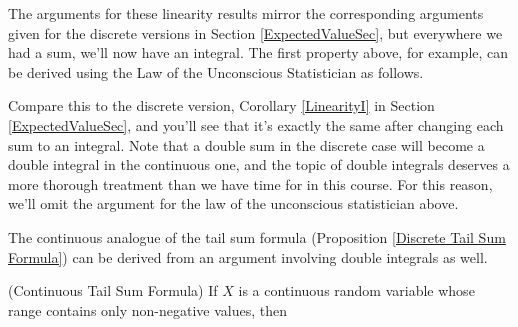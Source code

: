 \par
The arguments for these linearity results mirror the corresponding arguments given for the discrete versions in Section \ref{ExpectedValueSec}, but everywhere we had a sum, we'll now have an integral. The first property above, for example, can be derived using the Law of the Unconscious Statistician as follows.
\par
Compare this to the discrete version, Corollary \ref{LinearityI} in Section \ref{ExpectedValueSec}, and you'll see that it's exactly the same after changing each sum to an integral. Note that a double sum in the discrete case will become a double integral in the continuous one, and the topic of double integrals deserves a more thorough treatment than we have time for in this course. For this reason, we'll omit the argument for the law of the unconscious statistician above.
\par
The continuous analogue of the tail sum formula (Proposition \ref{Discrete Tail Sum Formula}) can be derived from an argument involving double integrals as well.
\begin{prop}\label{Continuous Tail Sum Formula}(Continuous Tail Sum Formula) If $X$ is a continuous random variable whose range contains only non-negative values, then
\end{prop}

